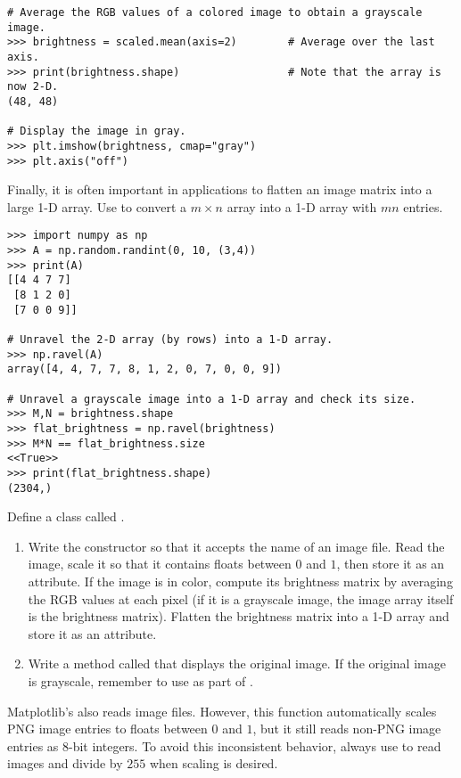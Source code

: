 \begin{lstlisting}
# Average the RGB values of a colored image to obtain a grayscale image.
>>> brightness = scaled.mean(axis=2)        # Average over the last axis.
>>> print(brightness.shape)                 # Note that the array is now 2-D.
(48, 48)

# Display the image in gray.
>>> plt.imshow(brightness, cmap="gray")
>>> plt.axis("off")
\end{lstlisting}

Finally, it is often important in applications to flatten an image matrix into a large 1-D array.
Use  to convert a $m\times n$ array into a 1-D array with $mn$ entries.

\begin{lstlisting}
>>> import numpy as np
>>> A = np.random.randint(0, 10, (3,4))
>>> print(A)
[[4 4 7 7]
 [8 1 2 0]
 [7 0 0 9]]

# Unravel the 2-D array (by rows) into a 1-D array.
>>> np.ravel(A)
array([4, 4, 7, 7, 8, 1, 2, 0, 7, 0, 0, 9])

# Unravel a grayscale image into a 1-D array and check its size.
>>> M,N = brightness.shape
>>> flat_brightness = np.ravel(brightness)
>>> M*N == flat_brightness.size
<<True>>
>>> print(flat_brightness.shape)
(2304,)
\end{lstlisting}

\begin{problem} %
Define a class called .
\begin{enumerate}
    \item Write the constructor so that it accepts the name of an image file.
    Read the image, scale it so that it contains floats between $0$ and $1$, then store it as an attribute.
    If the image is in color, compute its brightness matrix by averaging the RGB values at each pixel (if it is a grayscale image, the image array itself is the brightness matrix).
    Flatten the brightness matrix into a 1-D array and store it as an attribute.

    \item Write a method called  that displays the original image.
    If the original image is grayscale, remember to use  as part of .
\end{enumerate}
\end{problem}

\begin{warn} %
Matplotlib's  also reads image files.
However, this function automatically scales PNG image entries to floats between $0$ and $1$, but it still reads non-PNG image entries as 8-bit integers.
To avoid this inconsistent behavior, always use  to read images and divide by $255$ when scaling is desired.
\end{warn}

